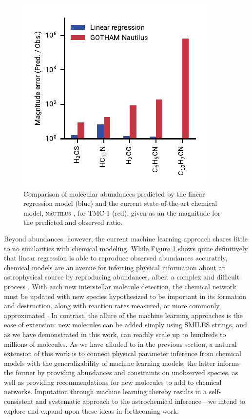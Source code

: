 \documentclass[twocolumn]{aastex63}
\begin{document}
\begin{figure}[ht]
    \centering
    \includegraphics[width=\columnwidth]{ml_model_comparison.pdf}
    \caption{Comparison of molecular abundances predicted by the linear regression model (blue) and the current state-of-the-art chemical model, \textsc{nautilus} \citep{ruaud_gas_2016}, for TMC-1 (red), given as an the magnitude for the predicted and observed ratio.}
    \label{fig:model_comp}
\end{figure}

Beyond abundances, however, the current machine learning approach shares little to no similarities with chemical modeling. While Figure \ref{fig:model_comp} shows quite definitively that linear regression is able to reproduce observed abundances accurately, chemical models are an avenue for inferring physical information about an astrophysical source by reproducing abundances, albeit a complex and difficult process \citep{agundez_chemistry_2013,herbst_formation_1973,van_dishoeck_comprehensive_1986}. With each new interstellar molecule detection, the chemical network must be updated with new species hypothesized to be important in its formation and destruction, along with reaction rates measured, or more commonly, approximated \citep{wakelam_reaction_2010}. In contrast, the allure of the machine learning approaches is the ease of extension: new molecules can be added simply using SMILES strings, and as we have demonstrated in this work, can readily scale up to hundreds to millions of molecules. As we have alluded to in the previous section, a natural extension of this work is to connect physical parameter inference from chemical models with the generalizability of machine learning models: the latter informs the former by providing abundances and constraints on unobserved species, as well as providing recommendations for new molecules to add to chemical networks. Imputation through machine learning thereby results in a self-consistent and systematic approach to the astrochemical inference---we intend to explore and expand upon these ideas in forthcoming work. 
\end{document}
